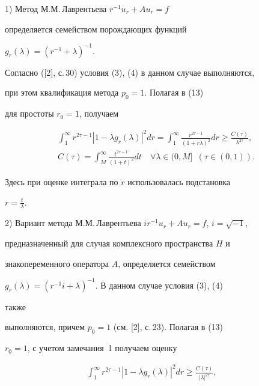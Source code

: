 \begin{exam} 


1) Метод М.М.\,Лаврентьева $r^{-1}u_r+Au_r=f$ 


определяется семейством порождающих функций 


$g_r(\lambda)=(r^{-1}+\lambda)^{-1}$. 


Согласно ([2], с.\,30) условия (3), (4) в данном случае выполняются, 


при этом квалификация метода $p_0=1$. Полагая в (13) 


для простоты $r_0=1$, получаем 


\begin{gather*} 


\int^\infty_1 r^{2\tau-1}|1-\lambda g_r(\lambda)|^2d r= 


\int^\infty_1\frac{r^{2\tau-1}}{(1+r\lambda)^2} d r


\ge\frac{C(\tau)}{\lambda^{2\tau}},\\ 


% 


C(\tau)=\int^\infty_M\frac{t^{2\tau-1}}{(1+t)^2}d t 


\quad \forall\lambda\in(0,M]\ \;(\tau\in(0,1)). 


\end{gather*} 


Здесь при оценке интеграла по $r$ использовалась подстановка 


$r=\frac{t}{\lambda}$. 


\smallskip 


 


2) Вариант метода М.М.\,Лаврентьева $i r^{-1}u_r+Au_r=f$, $i=\sqrt{-1}$, 


предназначенный для случая комплексного пространства $H$ и 


знакопеременного оператора $A$, определяется семейством 


$g_r(\lambda)=(r^{-1}i+\lambda)^{-1}$. В данном случае условия (3), (4) 


также 


выполняются, причем $p_0=1$ (см. [2], с.\,23). Полагая в (13) 


$r_0=1$, с учетом замечания~1 получаем оценку 


\begin{gather*} 


\int^\infty_1 r^{2\tau-1}|1-\lambda g_r(\lambda)|^2 d r\ge 


\frac{C(\tau)}{|\lambda|^{2\tau}},\quad 



\end{gather*}
\end{exam}
